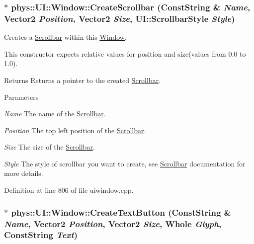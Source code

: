 \hypertarget{classphys_1_1UI_1_1Window_a2e66d320eb95d4e8474558267e85bdd4}{
\subsubsection[{CreateScrollbar}]{ $\ast$ phys::UI::Window::CreateScrollbar ({\bf ConstString} \& {\em Name}, \/  {\bf Vector2} {\em Position}, \/  {\bf Vector2} {\em Size}, \/  UI::ScrollbarStyle {\em Style})}}
\label{d4/d86/classphys_1_1UI_1_1Window_a2e66d320eb95d4e8474558267e85bdd4}


Creates a \hyperlink{classphys_1_1UI_1_1Scrollbar}{Scrollbar} within this \hyperlink{classphys_1_1UI_1_1Window}{Window}. 

This constructor expects relative values for position and size(values from 0.0 to 1.0). \begin{DoxyReturn}{Returns}
Returns a pointer to the created \hyperlink{classphys_1_1UI_1_1Scrollbar}{Scrollbar}. 
\end{DoxyReturn}

\begin{DoxyParams}{Parameters}
\item[{\em Name}]The name of the \hyperlink{classphys_1_1UI_1_1Scrollbar}{Scrollbar}. \item[{\em Position}]The top left position of the \hyperlink{classphys_1_1UI_1_1Scrollbar}{Scrollbar}. \item[{\em Size}]The size of the \hyperlink{classphys_1_1UI_1_1Scrollbar}{Scrollbar}. \item[{\em Style}]The style of scrollbar you want to create, see \hyperlink{classphys_1_1UI_1_1Scrollbar}{Scrollbar} documentation for more details. \end{DoxyParams}


Definition at line 806 of file uiwindow.cpp.

\hypertarget{classphys_1_1UI_1_1Window_aa4b5e6287496b6a47728ce9bde53ad90}{
\subsubsection[{CreateTextButton}]{ $\ast$ phys::UI::Window::CreateTextButton ({\bf ConstString} \& {\em Name}, \/  {\bf Vector2} {\em Position}, \/  {\bf Vector2} {\em Size}, \/  {\bf Whole} {\em Glyph}, \/  {\bf ConstString} {\em Text})}}
\label{d4/d86/classphys_1_1UI_1_1Window_aa4b5e6287496b6a47728ce9bde53ad90}


